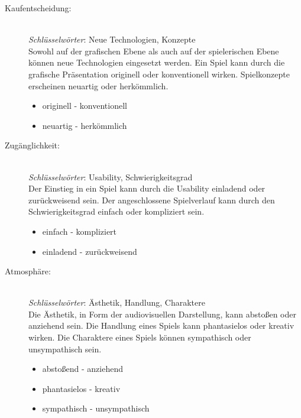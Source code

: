 \begin{description}
\item[Kaufentscheidung:] \  \\
\textit{Schlüsselwörter}: Neue Technologien, Konzepte \\
Sowohl auf der grafischen Ebene als auch auf der spielerischen Ebene  können neue Technologien eingesetzt werden. Ein Spiel kann durch die grafische Präsentation originell oder konventionell wirken. Spielkonzepte erscheinen neuartig oder herkömmlich.
    \begin{itemize}
        \item originell - konventionell %
        \item neuartig - herkömmlich
    \end{itemize}
\item[Zugänglichkeit:] \  \\ 
\textit{Schlüsselwörter}: Usability, Schwierigkeitsgrad  \\
Der Einstieg in ein Spiel kann durch die Usability einladend oder zurückweisend sein. Der angeschlossene Spielverlauf kann durch den Schwierigkeitsgrad einfach oder kompliziert sein.
    \begin{itemize}
        \item einfach - kompliziert %
        \item einladend - zurückweisend
    \end{itemize}
\item[Atmosphäre:] \  \\
\textit{Schlüsselwörter}: Ästhetik, Handlung, Charaktere \\
Die Ästhetik, in Form der audiovisuellen Darstellung, kann abstoßen oder anziehend sein. Die Handlung eines Spiels kann phantasielos oder kreativ wirken. Die Charaktere eines Spiels können sympathisch oder unsympathisch sein.
    \begin{itemize}
        \item abstoßend - anziehend %
        \item phantasielos - kreativ %
        \item sympathisch - unsympathisch
    \end{itemize}
    

\end{description}

